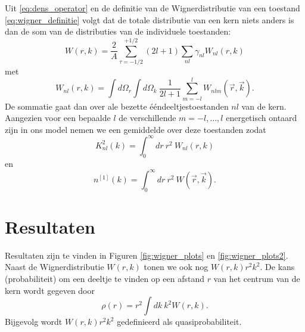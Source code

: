 \documentclass[11pt,twoside]{book}
\begin{document}
Uit \eqref{eq:dens_operator} en de definitie van de Wignerdistributie van een toestand \eqref{eq:wigner_definitie} volgt dat de totale distributie van een kern niets anders is dan de som van de distributies van de individuele toestanden:
\begin{equation} \label{eq:wigner_magnitude}
 W(r,k) = \frac{2}{A}\sum_{\tau = -1/2}^{+1/2} (2l+1) \sum_{nl} \gamma_{nl} W_{nl}(r,k) 
\end{equation}
met 
\begin{equation} \label{eq:wigner_level}
W_{nl}(r,k) = \int d\Omega_r \int d\Omega_k\ \frac{1}{2l+1} \sum_{m= -l}^{l}W_{nlm}(\vec{r},\vec{k}).
\end{equation}
De sommatie gaat dan over ale bezette \'{e}\'{e}ndeeltjestoestanden $nl$ van de kern. Aangezien voor een bepaalde $l$ de verschillende $m  = -l, \ldots, l$ energetisch ontaard zijn in ons model nemen we een gemiddelde over deze toestanden zodat
\begin{equation}
K^{2}_{nl}(k) =   \int_0^\infty dr\ r^2\ W_{nl}(r,k)
\end{equation}
en
\begin{equation} \label{eq:voorwaarde_2}
n^{[1]}(k) =  \int_0^\infty dr\ r^2\  W(\vec{r},\vec{k}).
\end{equation}
\section{Resultaten}



Resultaten zijn te vinden in Figuren \ref{fig:wigner_plots} en \ref{fig:wigner_plots2}. Naast de Wignerdistributie $W(r,k)$ tonen we ook nog $W(r,k)r^2 k^2$. De kans (probabiliteit) om een deeltje te vinden op een afstand $r$ van het centrum van de kern wordt gegeven door 
\begin{equation}
\rho (r) = r^2 \int dk\ k^2 W(r,k).
\end{equation}
Bijgevolg wordt $W(r,k)r^2 k^2$ gedefinieerd als quasiprobabiliteit.
\end{document}

